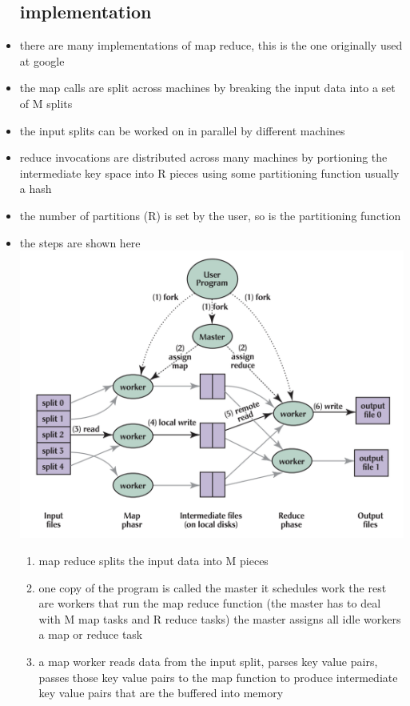 \documentclass{article}
\begin{document}
\begin{itemize}
    \subsection*{implementation}
    \item there are many implementations of map reduce, this is the one originally used at google
    \item the map calls are split across machines by breaking the input data into a set of M splits
    \item the input splits can be worked on in parallel by different machines 
    \item reduce invocations are distributed across many machines by portioning the intermediate key space into R pieces using some partitioning function usually a hash 
    \item the number of partitions (R) is set by the user, so is the partitioning function 
   \item the steps are shown here \includegraphics{images/Screenshot 2023-05-08 at 3.18.27 PM.png}
    \begin{enumerate}
        \item map reduce splits the input data into M pieces
        \item one copy of the program is called the master it schedules work the rest are workers that run the map reduce function (the master has to deal with M map tasks and R reduce tasks) the master assigns all idle workers a map or reduce task 
        \item a map worker reads data from the input split, parses key value pairs, passes those key value pairs to the map function to produce intermediate key value pairs that are the buffered into memory

\end{enumerate}
\end{itemize}
\end{document}
